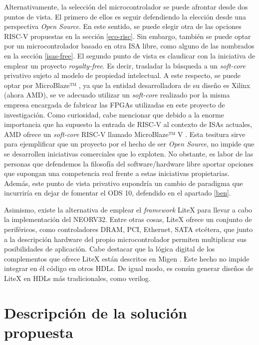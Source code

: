 Alternativamente, la selección del microcontrolador se puede afrontar desde dos puntos de vista.
El primero de ellos es seguir defendiendo la elección desde una perspectiva \textit{Open Source}.
En este sentido, se puede elegir otra de las opciones RISC-V propuestas en la sección \ref{eco-risc}.
Sin embargo, también se puede optar por un microcontrolador basado en otra ISA libre, como alguno de las nombrados en la sección \ref{isas-free}.
El segundo punto de vista es claudicar con la iniciativa de emplear un proyecto \textit{royalty-free}.
Es decir, trasladar la búsqueda a un \textit{soft-core} privativo sujeto al modelo de propiedad intelectual.
A este respecto, se puede optar por MicroBlaze™ \cite{microblaze}, ya que la entidad desarrolladora de su diseño es Xilinx (ahora AMD), se ve adecuado utilizar un \textit{soft-core} realizado por la misma empresa encargada de fabricar las FPGAs utilizadas en este proyecto de investigación.
Como curiosidad, cabe mencionar que debido a la enorme importancia que ha supuesto la entrada de RISC-V al contexto de ISAs actuales, AMD ofrece un \textit{soft-core} RISC-V llamado MicroBlaze™ V \cite{microblazeV}.
Esta tesitura sirve para ejemplificar que un proyecto por el hecho de ser \textit{Open Source}, no impide que se desarrollen iniciativas comerciales que lo exploten.
No obstante, es labor de las personas que defendemos la filosofía del software/hardware libre aportar opciones que supongan una competencia real frente a estas iniciativas propietarias.
Además, este punto de vista privativo supondría un cambio de paradigma que incurriría en dejar de fomentar el ODS 10, defendido en el apartado \ref{ben}.

Asimismo, existe la alternativa de emplear el \textit{framework} LiteX \cite{gh:litex} para llevar a cabo la implementación del NEORV32.
Entre otras cosas, LiteX ofrece un conjunto de periféricos, como controladores DRAM, PCI, Ethernet, SATA etcétera, que junto a la descripción hardware del propio microcontrolador permiten multiplicar sus posibilidades de aplicación.
Cabe destacar que la lógica digital de los complementos que ofrece LiteX están descritos en Migen \cite{gh:migen}.
Este hecho no impide integrar en él código en otros HDLs.
De igual modo, es común generar diseños de LiteX en HDLs más tradicionales, como verilog.


\section{Descripción de la solución propuesta}

